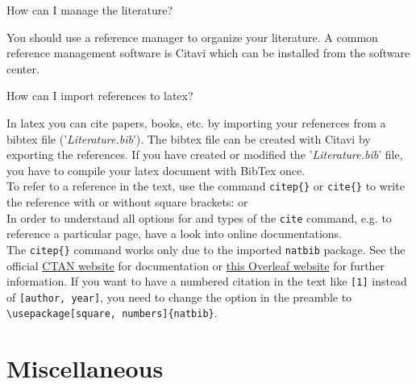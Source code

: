 \begin{QandA}

\item How can I manage the literature?
	\begin{answered}
		You should use a reference manager to organize your literature. A common reference management software is Citavi which can be installed from the software center.
	\end{answered}


\item How can I import references to latex?

	\begin{answered}
		In latex you can cite papers, books, etc. by importing your refenerces from a bibtex file ('\textit{Literature.bib}').
		 The bibtex file can be created with Citavi by exporting the references. 
		 If you have created or modified the '\textit{Literature.bib}' file, you have to compile your latex document with BibTex once. \\
		 To refer to a reference in the text, use the command \verb|citep{}| or \verb|cite{}| to write the reference with or without square brackets: \citep{Lamberg2003} \quad or \quad \cite{Lamberg2003}	\\
		 In order to understand all options for and types of the \verb|cite| command, e.g. to reference a particular page, have a look into online documentations. \\
		 The \verb|citep{}| command works only due to the imported \texttt{natbib} package. See the official \href{https://ctan.org/pkg/natbib?}{CTAN website} for documentation or \href{https://de.overleaf.com/learn/latex/Bibliography_management_with_natbib}{this Overleaf website} for further information. 
		 If you want to have a numbered citation in the text like \verb|[1]| instead of \verb|[author, year]|, you need to change the option in the preamble to \verb|\usepackage[square, numbers]{natbib}|.
	\end{answered}
	
\end{QandA}







\section{Miscellaneous}
\label{sec:Misc}

